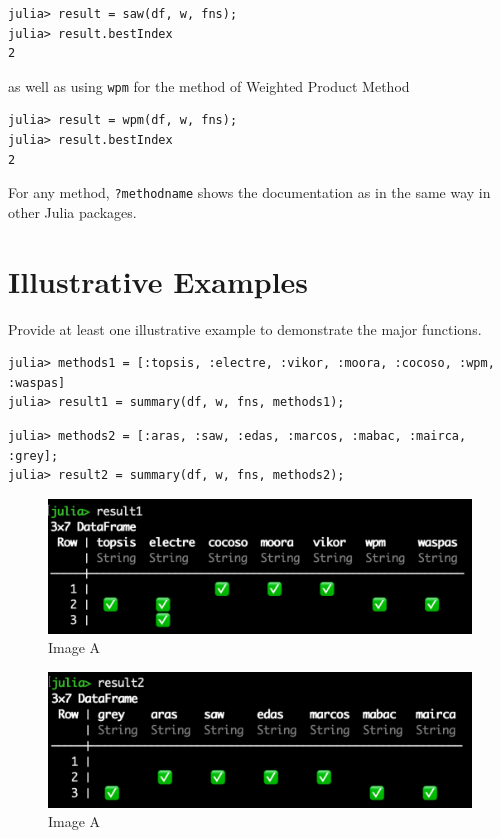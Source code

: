 \documentclass[authoryear,preprint,review,12pt]{elsarticle}
\begin{document}
\begin{verbatim}
julia> result = saw(df, w, fns);
julia> result.bestIndex
2
\end{verbatim}

\noindent as well as using \texttt{wpm} for the method of Weighted Product Method

\begin{verbatim}
julia> result = wpm(df, w, fns);
julia> result.bestIndex
2
\end{verbatim}

For any method, \texttt{?methodname} shows the documentation as in the same way in other Julia packages.

\section{Illustrative Examples}
\label{}
{\color{red}Provide at least one illustrative example to demonstrate the major functions.}

\begin{verbatim}
julia> methods1 = [:topsis, :electre, :vikor, :moora, :cocoso, :wpm, :waspas]
julia> result1 = summary(df, w, fns, methods1);
\end{verbatim}

\begin{verbatim}
julia> methods2 = [:aras, :saw, :edas, :marcos, :mabac, :mairca, :grey];
julia> result2 = summary(df, w, fns, methods2);
\end{verbatim}

\begin{figure}
	\includegraphics[width=\columnwidth]{images/result1}
	\caption{Image A}
	\label{fig:imagea}
	\end{figure}

	\begin{figure}
		\includegraphics[width=\columnwidth]{images/result2}
		\caption{Image A}
		\label{fig:imagea}
		\end{figure}
\end{document}
